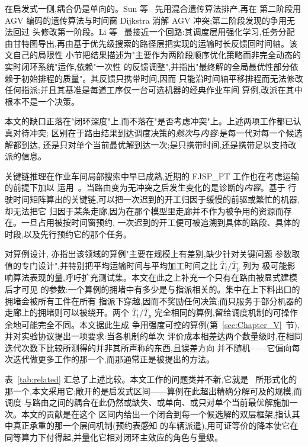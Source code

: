 \documentclass[manuscript,screen,review]{acmart}
\begin{document}
在启发式一侧,耦合仍是单向的。Sun 等~\cite{sun2023integrated} 先用混合遗传算法排产,再在
第二阶段用 AGV 编码的遗传算法与时间窗 Dijkstra 消解 AGV 冲突;第二阶段发现的争用无法回过
头修改第一阶段。Li 等~\cite{li2026framework} 最接近一个回路:其调度层用强化学习,任务分配
由甘特图导出,再由基于优先级搜索的路径层把实现的运输时长反馈回时间轴。该文自己的局限性
小节把结果描述为"主要作为两阶段顺序优化策略而非完全动态的实时闭环系统"运作,依赖"一次性
的反馈调整",并指出"最终解的全局最优性部分依赖于初始排程的质量"。其反馈只携带时间,因而
只能沿时间轴平移排程而无法修改任何指派;并且其基准是每道工序仅一台可选机器的经典作业车间
算例,改派在其中根本不是一个决策。

本文的缺口正落在"闭环深度"上,而不落在"是否考虑冲突"上。上述两项工作都已认真对待冲突;
区别在于路由结果到达调度决策的\emph{频次}与\emph{内容}:是每一代对每一个候选解都到达,
还是只对单个当前最优解到达一次;是只携带时间,还是携带足以支持改派的信息。

关键链推理在作业车间局部搜索中早已成熟,近期的 FJSP\_PT 工作也在考虑运输的前提下加以
运用~\cite{qin2026knowledge}。当路由变为无冲突之后发生变化的是诊断的\emph{内容}。基于
行驶时间矩阵算出的关键链,可以把一次迟到的开工归因于缓慢的前驱或繁忙的机器,却无法把它
归因于某条走廊,因为在那个模型里走廊并不作为被争用的资源而存在。一旦占用被按时间窗预约,
一次迟到的开工便可被追溯到具体的路段、具体的时段,以及先行预约它的那个任务。

对算例设计,\cite{xin2025review} 亦指出该领域的算例"主要在规模上有差别,缺少针对关键问题
参数取值的专门设计",并特别把平均运输时间与平均加工时间之比 $\bar{T}_t/\bar{T}_p$ 列为
极可能影响算法表现的量,呼吁扩充测试集。本文在此之上补充一个只有在路由被显式建模后才可见
的参数:一个算例的拥堵中有多少是与指派相关的。集中在上下料出口的拥堵会被所有工件在所有
指派下穿越,因而不奖励任何决策;而只服务于部分机器的走廊上的拥堵则可以被绕开。两个
$\bar{T}_t/\bar{T}_p$ 完全相同的算例,留给调度机制的可操作余地可能完全不同。本文据此生成
争用强度可控的算例(第~\ref{sec:Chapter_V}~节),并对实验协议提出一项要求:当各机制的单次
评价成本相差达两个数量级时,在相同迭代次数下比较所测得的并非其所声称的东西,且误差方向
并不随机——它偏向每次迭代做更多工作的那一个,而那通常正是被提出的方法。

表~\ref{tab:related} 汇总了上述比较。本文工作的问题类并不新,它就是~\cite{vanos2026exact}
所形式化的那一个,本文采用它;敞开的是启发式区间——算例在此超出精确分解可及的规模,而调度
与路由之间的耦合在此仍然或缺失、或单向、或只对单个当前最优解施加一次。本文的贡献是在这个
区间内给出一个闭合到每一个候选解的双层框架,指认其中真正承重的那一个层间机制(预约表感知
的车辆派遣),用可证等价的降本使它在同等算力下付得起,并量化它相对闭环主效应的角色与量级。
\end{document}
